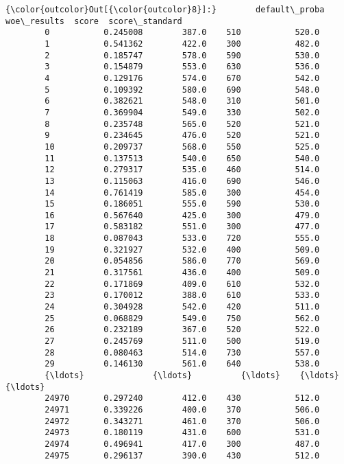 \documentclass[11pt]{article}
\begin{document}
\begin{Verbatim}[commandchars=\\\{\}]
{\color{outcolor}Out[{\color{outcolor}8}]:}        default\_proba  woe\_results  score  score\_standard
        0           0.245008        387.0    510           520.0
        1           0.541362        422.0    300           482.0
        2           0.185747        578.0    590           530.0
        3           0.154879        553.0    630           536.0
        4           0.129176        574.0    670           542.0
        5           0.109392        580.0    690           548.0
        6           0.382621        548.0    310           501.0
        7           0.369904        549.0    330           502.0
        8           0.235748        565.0    520           521.0
        9           0.234645        476.0    520           521.0
        10          0.209737        568.0    550           525.0
        11          0.137513        540.0    650           540.0
        12          0.279317        535.0    460           514.0
        13          0.115063        416.0    690           546.0
        14          0.761419        585.0    300           454.0
        15          0.186051        555.0    590           530.0
        16          0.567640        425.0    300           479.0
        17          0.583182        551.0    300           477.0
        18          0.087043        533.0    720           555.0
        19          0.321927        532.0    400           509.0
        20          0.054856        586.0    770           569.0
        21          0.317561        436.0    400           509.0
        22          0.171869        409.0    610           532.0
        23          0.170012        388.0    610           533.0
        24          0.304928        542.0    420           511.0
        25          0.068829        549.0    750           562.0
        26          0.232189        367.0    520           522.0
        27          0.245769        511.0    500           519.0
        28          0.080463        514.0    730           557.0
        29          0.146130        561.0    640           538.0
        {\ldots}              {\ldots}          {\ldots}    {\ldots}             {\ldots}
        24970       0.297240        412.0    430           512.0
        24971       0.339226        400.0    370           506.0
        24972       0.343271        461.0    370           506.0
        24973       0.180119        431.0    600           531.0
        24974       0.496941        417.0    300           487.0
        24975       0.296137        390.0    430           512.0

\end{Verbatim}
\end{document}

